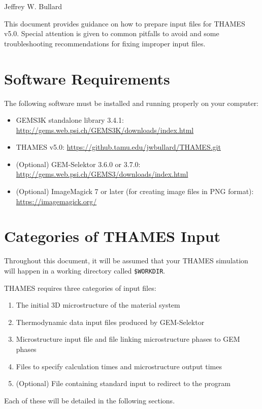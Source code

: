 \documentclass{article}
\begin{document}
\lstset{language=XML,stringstyle=\ttfamily}

\begin{center}
	\Large{\textbf{}}
\end{center}
\begin{center}
	\large{Jeffrey W. Bullard}
\end{center}
\begin{center}
	\large{\DTMnow}
\end{center}

\vspace{0.25truein}
\tableofcontents

\vspace{0.25truein}
This document provides guidance on how to prepare input files for THAMES v5.0. Special
attention is given to common pitfalls to avoid and some troubleshooting recommendations
for fixing improper input files.

\section{\label{sec:requirements} Software Requirements}
The following software must be installed and running properly on your computer:
\begin{itemize}
	\item GEMS3K standalone library 3.4.1: \href{http://gems.web.psi.ch/GEMS3K/downloads/index.html}{http://gems.web.psi.ch/GEMS3K/downloads/index.html}
	\item THAMES v5.0: \href{https://github.tamu.edu/jwbullard/THAMES.git}{https://github.tamu.edu/jwbullard/THAMES.git}
	\item (Optional) GEM-Selektor 3.6.0 or 3.7.0: \href{http://gems.web.psi.ch/GEMS3/downloads/index.html}{http://gems.web.psi.ch/GEMS3/downloads/index.html}
	\item (Optional) ImageMagick 7 or later (for creating image files in PNG format): \href{https://imagemagick.org/}{https://imagemagick.org/}
\end{itemize}

\section{\label{sec:categories} Categories of THAMES Input}
Throughout this document, it will be assumed that your THAMES simulation will happen
in a working directory called \verb!$WORKDIR!.

THAMES requires three categories of input files:
\begin{enumerate}
	\item The initial 3D microstructure of the material system
	\item Thermodynamic data input files produced by GEM-Selektor
	\item Microstructure input file and file linking microstructure phases to GEM phases
	\item Files to specify calculation times and microstructure output times
	\item (Optional) File containing standard input to redirect to the program
\end{enumerate}
Each of these will be detailed in the following sections.
\end{document}
